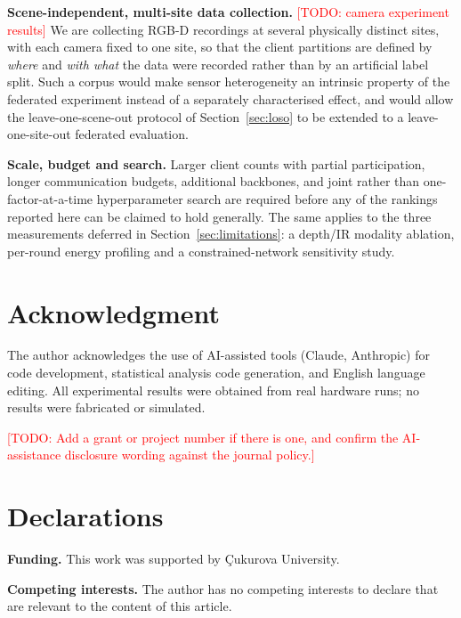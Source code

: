 \documentclass[journal]{IEEEtran}
\newcommand{\todo}[1]{\textcolor{red}{[TODO: #1]}}
\begin{document}
\textbf{Scene-independent, multi-site data collection.} \todo{camera experiment results} We are collecting RGB-D recordings at several physically distinct sites, with each camera fixed to one site, so that the client partitions are defined by \emph{where} and \emph{with what} the data were recorded rather than by an artificial label split. Such a corpus would make sensor heterogeneity an intrinsic property of the federated experiment instead of a separately characterised effect, and would allow the leave-one-scene-out protocol of Section~\ref{sec:loso} to be extended to a leave-one-site-out federated evaluation.

\textbf{Scale, budget and search.} Larger client counts with partial participation, longer communication budgets, additional backbones, and joint rather than one-factor-at-a-time hyperparameter search are required before any of the rankings reported here can be claimed to hold generally. The same applies to the three measurements deferred in Section~\ref{sec:limitations}: a depth/IR modality ablation, per-round energy profiling and a constrained-network sensitivity study.


\section*{Acknowledgment}

The author acknowledges the use of AI-assisted tools (Claude, Anthropic) for code development, statistical analysis code generation, and English language editing. All experimental results were obtained from real hardware runs; no results were fabricated or simulated.

\todo{Add a grant or project number if there is one, and confirm the AI-assistance disclosure wording against the journal policy.}

\section*{Declarations}

\textbf{Funding.} This work was supported by \c{C}ukurova University.

\textbf{Competing interests.} The author has no competing interests to declare that are relevant to the content of this article.
\end{document}
